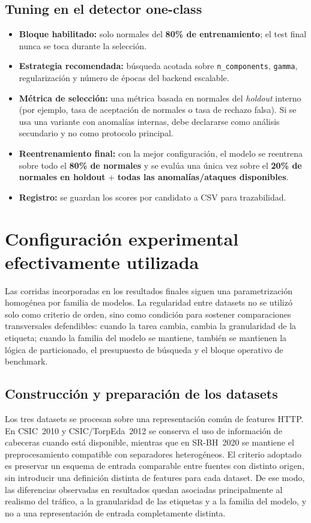 \documentclass[12pt,oneside]{report}
\begin{document}
\subsection{Tuning en el detector one-class}
\begin{itemize}[leftmargin=*]
  \item \textbf{Bloque habilitado:} solo normales del \textbf{80\% de entrenamiento}; el test final nunca se toca durante la selección.
  \item \textbf{Estrategia recomendada:} búsqueda acotada sobre \texttt{n\_components}, \texttt{gamma}, regularización y número de épocas del backend escalable. 
  \item \textbf{Métrica de selección:} una métrica basada en normales del \textit{holdout} interno (por ejemplo, tasa de aceptación de normales o tasa de rechazo falsa). Si se usa una variante con anomalías internas, debe declararse como análisis secundario y no como protocolo principal.
  \item \textbf{Reentrenamiento final:} con la mejor configuración, el modelo se reentrena sobre todo el \textbf{80\% de normales} y se evalúa una única vez sobre el \textbf{20\% de normales en holdout} + \textbf{todas las anomalías/ataques disponibles}.
  \item \textbf{Registro:} se guardan los scores por candidato a CSV para trazabilidad.
\end{itemize}


\section{Configuración experimental efectivamente utilizada}
Las corridas incorporadas en los resultados finales siguen una parametrización homogénea por familia de modelos. La regularidad entre datasets no se utilizó solo como criterio de orden, sino como condición para sostener comparaciones transversales defendibles: cuando la tarea cambia, cambia la granularidad de la etiqueta; cuando la familia del modelo se mantiene, también se mantienen la lógica de particionado, el presupuesto de búsqueda y el bloque operativo de benchmark.

\subsection{Construcción y preparación de los datasets}
Los tres datasets se procesan sobre una representación común de features HTTP. En CSIC~2010 y CSIC/TorpEda~2012 se conserva el uso de información de cabeceras cuando está disponible, mientras que en SR-BH~2020 se mantiene el preprocesamiento compatible con separadores heterogéneos. El criterio adoptado es preservar un esquema de entrada comparable entre fuentes con distinto origen, sin introducir una definición distinta de features para cada dataset. De ese modo, las diferencias observadas en resultados quedan asociadas principalmente al realismo del tráfico, a la granularidad de las etiquetas y a la familia del modelo, y no a una representación de entrada completamente distinta.
\end{document}
